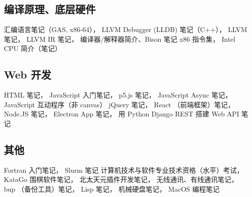 \subsection{编译原理、底层硬件}
汇编语言笔记（GAS, x86-64），
LLVM Debugger (LLDB) 笔记（C++），
LLVM 笔记，
LLVM IR 笔记，
编译器/解释器简介、Bison 笔记
x86 指令集，
Intel CPU 简介（笔记）

\subsection{Web 开发}
HTML 笔记，
JavaScript 入门笔记，
p5.js 笔记，
JavaScript Async 笔记，
JavaScript 互动程序（非 canvas）
jQuery 笔记，
React （前端框架）笔记，
Node.JS 笔记，
Electron App 笔记，
用 Python Django REST 搭建 Web API 笔记

\subsection{其他}
Fortran 入门笔记，
Slurm 笔记
计算机技术与软件专业技术资格（水平）考试，
KataGo 围棋软件笔记，
北太天元插件开发笔记，
无线通讯、有线通讯笔记，
bup （备份工具）笔记，
Lisp 笔记，
机械硬盘笔记，
MacOS 编程笔记
